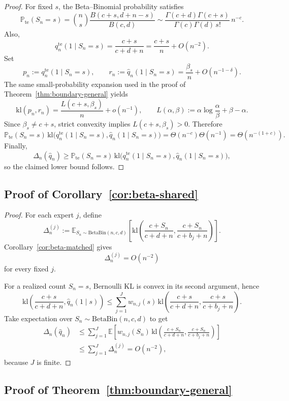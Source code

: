 \documentclass{article}
\theoremstyle{definition}
\theoremstyle{remark}
\newcommand{\E}{\mathbb{E}}
\newcommand{\Pbb}{\mathbb{P}}
\newcommand{\BetaBin}{\mathrm{BetaBin}}
\newcommand{\te}{\mathrm{te}}
\newcommand{\klb}{\mathrm{kl}}
\begin{document}
\begin{proof}
For fixed $s$, the Beta--Binomial probability satisfies
\[
\Pbb_{\te}(S_n=s)
=
\binom{n}{s}\frac{B(c+s,d+n-s)}{B(c,d)}
\sim
\frac{\Gamma(c+d)\Gamma(c+s)}{\Gamma(c)\Gamma(d)\,s!}\,n^{-c}.
\]
Also,
\[
q_n^{\te}(1\mid S_n=s)=\frac{c+s}{c+d+n}=\frac{c+s}{n}+O(n^{-2}).
\]
Set
\[
p_n:=q_n^{\te}(1\mid S_n=s),
\qquad
r_n:=\hat q_n(1\mid S_n=s)=\frac{\beta_s}{n}+O(n^{-1-\delta}).
\]
The same small-probability expansion used in the proof of Theorem~\ref{thm:boundary-general} yields
\[
\klb(p_n,r_n)
=
\frac{L(c+s,\beta_s)}{n}+o(n^{-1}),
\qquad
L(\alpha,\beta):=\alpha\log\frac{\alpha}{\beta}+\beta-\alpha.
\]
Since $\beta_s\neq c+s$, strict convexity implies $L(c+s,\beta_s)>0$. Therefore
\[
\Pbb_{\te}(S_n=s)\,
\klb\bigl(
q_n^{\te}(1\mid S_n=s),
\hat q_n(1\mid S_n=s)
\bigr)
=
\Theta(n^{-c})\Theta(n^{-1})
=
\Theta(n^{-(1+c)}).
\]
Finally,
\[
\Delta_n(\hat q_n)
\ge
\Pbb_{\te}(S_n=s)\,
\klb\bigl(
q_n^{\te}(1\mid S_n=s),
\hat q_n(1\mid S_n=s)
\bigr),
\]
so the claimed lower bound follows.
\end{proof}

\subsection{Proof of Corollary~\ref{cor:beta-shared}}
\begin{proof}
For each expert $j$, define
\[
\Delta_n^{(j)}
:=
\E_{S_n\sim \BetaBin(n,c,d)}
\left[
\klb\!\left(
\frac{c+S_n}{c+d+n},
\frac{c+S_n}{c+b_j+n}
\right)
\right].
\]
Corollary~\ref{cor:beta-matched} gives
\[
\Delta_n^{(j)}=O(n^{-2})
\]
for every fixed $j$.

For a realized count $S_n=s$, Bernoulli KL is convex in its second argument, hence
\[
\klb\!\left(
\frac{c+s}{c+d+n},
\hat q_n(1\mid s)
\right)
\le
\sum_{j=1}^J w_{n,j}(s)\,
\klb\!\left(
\frac{c+s}{c+d+n},
\frac{c+s}{c+b_j+n}
\right).
\]
Take expectation over $S_n\sim \BetaBin(n,c,d)$ to get
\begin{align*}
\Delta_n(\hat q_n)
&\le
\sum_{j=1}^J
\E\!\left[
w_{n,j}(S_n)\,
\klb\!\left(
\frac{c+S_n}{c+d+n},
\frac{c+S_n}{c+b_j+n}
\right)
\right] \\
&\le
\sum_{j=1}^J \Delta_n^{(j)}
=
O(n^{-2}),
\end{align*}
because $J$ is finite.
\end{proof}

\subsection{Proof of Theorem~\ref{thm:boundary-general}}
\end{document}

